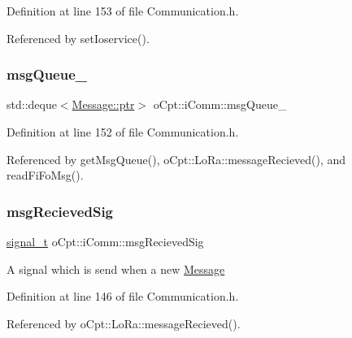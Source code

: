 Definition at line 153 of file Communication.\+h.



Referenced by set\+Ioservice().

\hypertarget{classo_cpt_1_1i_comm_aa4bc236cd4492ea8b4fd2481de58b43f}{}\label{classo_cpt_1_1i_comm_aa4bc236cd4492ea8b4fd2481de58b43f} 
\subsubsection{\texorpdfstring{msg\+Queue\+\_\+}{msgQueue\_}}
{\footnotesize\ttfamily std\+::deque$<$\hyperlink{structo_cpt_1_1i_comm_1_1_message_ad2ba828ad76f96a30e3898b2609a4c01}{Message\+::ptr}$>$ o\+Cpt\+::i\+Comm\+::msg\+Queue\+\_\+\hspace{0.3cm}{\ttfamily [protected]}}



Definition at line 152 of file Communication.\+h.



Referenced by get\+Msg\+Queue(), o\+Cpt\+::\+Lo\+Ra\+::message\+Recieved(), and read\+Fi\+Fo\+Msg().

\hypertarget{classo_cpt_1_1i_comm_a575554cfd0889ae4d8920417e3c4ef55}{}\label{classo_cpt_1_1i_comm_a575554cfd0889ae4d8920417e3c4ef55} 
\subsubsection{\texorpdfstring{msg\+Recieved\+Sig}{msgRecievedSig}}
{\footnotesize\ttfamily \hyperlink{classo_cpt_1_1i_comm_a8226eab43e254e986c1645cb1c500ef7}{signal\+\_\+t} o\+Cpt\+::i\+Comm\+::msg\+Recieved\+Sig}

A signal which is send when a new \hyperlink{structo_cpt_1_1i_comm_1_1_message}{Message} 

Definition at line 146 of file Communication.\+h.



Referenced by o\+Cpt\+::\+Lo\+Ra\+::message\+Recieved().

\hypertarget{classo_cpt_1_1i_comm_a1e9989bd934719256f4b50123825c00e}{}\label{classo_cpt_1_1i_comm_a1e9989bd934719256f4b50123825c00e} 
